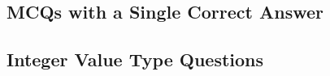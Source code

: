 \subsection*{MCQs with a Single Correct Answer}
\begin{enumerate}[label=\thechapter.\arabic*,ref=\thechapter.\theenumi]




\end{enumerate}
\subsection*{Integer Value Type Questions}
\begin{enumerate}[label=\thechapter.\arabic*,ref=\thechapter.\theenumi]




\end{enumerate}
